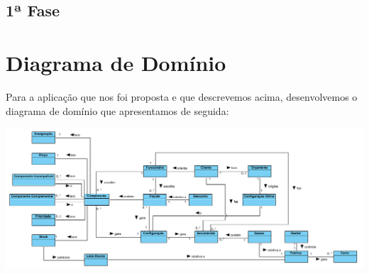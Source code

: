 \documentclass[11pt]{article} %
\begin{document}
\begin{center}
\section*{1ª Fase}
\end{center}

\section{Diagrama de Domínio}
Para a aplicação que nos foi proposta e que descrevemos acima, desenvolvemos o diagrama de domínio que apresentamos de seguida:
\begin{center}
 \includegraphics[width = 6.5in]{Dominio.png}
\end{center}

\newpage
\end{document}
